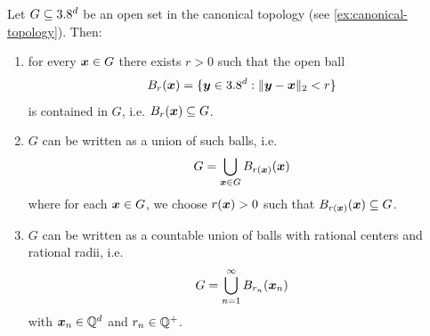 
\begin{proposition}\label{prop:open-sets-balls} %
Let $G \subseteq 3.8^d$ be an open set in the canonical topology (see \autoref{ex:canonical-topology}). 
Then:
\begin{enumerate}[label=(\alph*)]
\item \label{item:every-point-in-open-set-is-interior-point}
for every ${\boldsymbol{x}} \in G$ there exists $r>0$ such that the open ball
\[
B_r({\boldsymbol{x}}) = \{{\boldsymbol{y}} \in 3.8^d : \|{\boldsymbol{y}} - {\boldsymbol{x}}\|_2 < r\}
\]
is contained in $G$, i.e. $B_r({\boldsymbol{x}}) \subseteq G$.
\item 
$G$ can be written as a union of such balls, i.e.
\[
G=\bigcup_{{\boldsymbol{x}}\in G} B_{r({\boldsymbol{x}})}({\boldsymbol{x}})
\]
where for each ${\boldsymbol{x}}\in G$, we choose $r({\boldsymbol{x}})>0$ such that $B_{r({\boldsymbol{x}})}({\boldsymbol{x}}) \subseteq G$.
\item 
$G$ can be written as a countable union of balls with rational centers and rational radii, i.e.
\[
G=\bigcup_{n=1}^{\infty} B_{r_n}({\boldsymbol{x}}_n)
\]
with ${\boldsymbol{x}}_n \in \mathbb{Q}^d$ and $r_n \in \mathbb{Q}^+$.
\qedhere
\end{enumerate}
\end{proposition}

